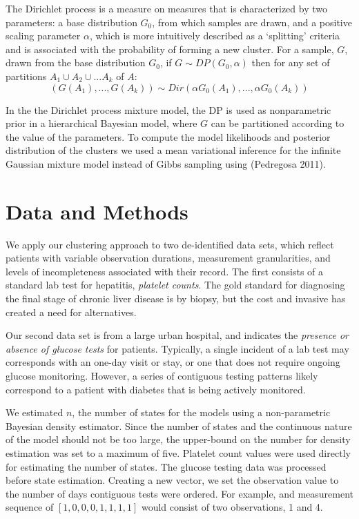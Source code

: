 \documentclass[letterpaper]{article}
\begin{document}
The Dirichlet process is a measure on measures that is characterized by two parameters: a base distribution $G_0$, from which samples are drawn, and a positive scaling parameter $\alpha$, which is more intuitively described as a `splitting' criteria and is associated with the probability of forming a new cluster.  For a sample, $G$, drawn from the base distribution $G_0$, if $G \sim DP(G_0,\alpha)$ then for any set of partitions $A_1 \cup A_2 \cup ... A_k$ of $A$:
$$(G(A_1),...,G(A_k)) \sim Dir(\alpha G_0(A_1),...,\alpha G_0(A_k))$$

In the the Dirichlet process mixture model, the DP is used as nonparametric prior in a hierarchical Bayesian model, where $G$ can be partitioned according to the value of the parameters.  To compute the model likelihoods and posterior distribution of the clusters we used a mean variational inference for the infinite Gaussian mixture model instead of Gibbs sampling using (Pedregosa 2011).

\section{Data and Methods}
 We apply our clustering approach to two de-identified data sets, which reflect patients with variable observation durations, measurement granularities, and levels of incompleteness associated with their record.  The first consists of a standard lab test for hepatitis, \emph{platelet counts}.  The gold standard for diagnosing the final stage of chronic liver disease is by biopsy, but the cost and invasive has created a need for alternatives.

Our second data set is from a large urban hospital, and indicates the \emph{presence or absence of glucose tests} for patients.  Typically, a single incident of a lab test may corresponds with an one-day visit or stay, or one that does not require ongoing glucose monitoring.  However, a series of contiguous testing patterns likely correspond to a patient with diabetes that is being actively monitored.

We estimated $n$, the number of states for the models using a non-parametric Bayesian density estimator.  Since the number of states and the continuous nature of the model should not be too large, the upper-bound on the number for density estimation was set to a maximum of five.  Platelet count values were used directly for estimating the number of states.  The glucose testing data was processed before state estimation.  Creating a new vector, we set the observation value to the number of days contiguous tests were ordered.  For example, and measurement sequence of $[1,0,0,0,1,1,1,1]$ would consist of two observations, 1 and 4.
\end{document}
